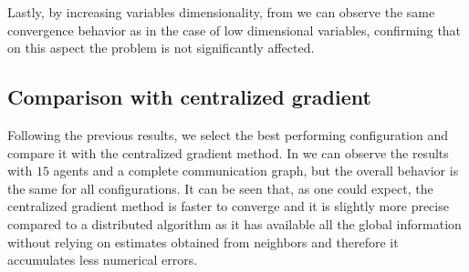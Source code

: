 \documentclass[a4paper,11pt,oneside]{book}
\begin{document}
Lastly, by increasing variables dimensionality, from  we can observe the same convergence behavior as in the case of low dimensional variables, confirming that on this aspect the problem is not significantly affected.


\subsection{Comparison with centralized gradient}

Following the previous results, we select the best performing configuration and compare it with the centralized gradient method. In  we can observe the results with $15$ agents and a complete communication graph, but the overall behavior is the same for all configurations. It can be seen that, as one could expect, the centralized gradient method is faster to converge and it is slightly more precise compared to a distributed algorithm as it has available all the global information without relying on estimates obtained from neighbors and therefore it accumulates less numerical errors.
\end{document}
